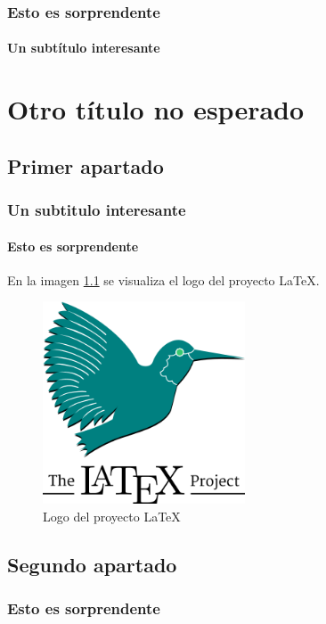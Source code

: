 \documentclass[12pt]{report}
\begin{document}
\subsection{Esto es sorprendente}
\lipsum[3-4]
\subsubsection{Un subtítulo interesante}
\lipsum[5-7]

\chapter{Otro título no esperado}
   \lipsum[1-3]
\section{Primer apartado}
   \lipsum[4-5]
\subsection{Un subtitulo interesante}
   \lipsum[6]
\subsubsection{Esto es sorprendente}
   \lipsum[2-3]
   En la imagen \ref{fig:proyecto_tres} se visualiza el logo del proyecto \LaTeX.

\begin{figure}[ht]
   \centering
   \includegraphics[width=6cm]{latex.png}
   \caption{Logo del proyecto \LaTeX}
   \label{fig:proyecto_tres}
\end{figure}
\section{Segundo apartado}
   \lipsum[1]
   \subsection{Esto es sorprendente}
   \lipsum[2]
\end{document}
